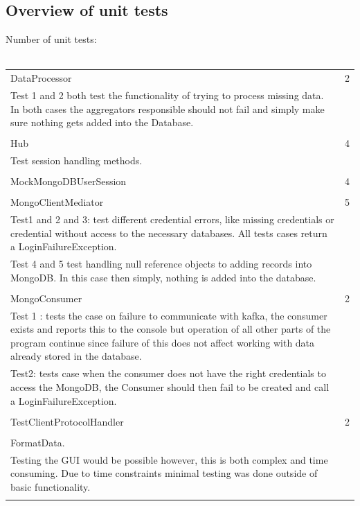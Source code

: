 \documentclass[oneside, english, final]{design}
\begin{document}
\subsection{Overview of unit tests}
Number of unit tests:\\
\hfill
\\
\begin{tabular}{|p{}p{}}
DataProcessor & 2\\  Test 1 and 2 both test the functionality of trying to process missing data. In both cases the aggregators responsible should not fail and simply make sure nothing gets added into the Database.\\ \\
Hub & 4\\ Test session handling methods.\\ \\
MockMongoDBUserSession & 4\\ \\
MongoClientMediator & 5 \\ Test1 and 2 and 3: test different credential errors, like missing credentials or credential without access to the necessary databases. All tests cases return a LoginFailureException.\\ 
Test 4 and 5 test handling null reference objects to adding records into MongoDB. In this case then simply, nothing is added into the database.\\ \\
MongoConsumer & 2 \\ Test 1 : tests the case on failure to communicate with kafka, the consumer exists and reports this to the console but operation of all other parts of the program continue since failure of this does not affect working with data already stored in the database.\\
Test2: tests case when the consumer does not have the right credentials to access the MongoDB, the Consumer should then fail to be created and call a LoginFailureException.\\ \\
TestClientProtocolHandler & 2 \\ \\
FormatData. & \\ Testing the GUI would be possible however, this is both complex and time consuming. Due to time constraints minimal testing was done outside of basic functionality.\\ \\
\end{tabular}
\end{document}
